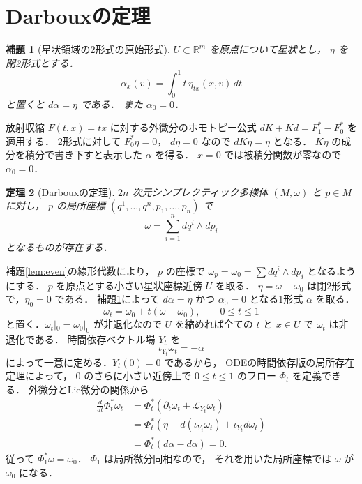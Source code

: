 \documentclass[a5paper,10pt,onecolumn]{jsarticle}
\makeatletter
\theoremstyle{mathnotetheorem}
\newtheorem{theorem}{定理}[section]
\newtheorem{lemma}[theorem]{補題}
\renewcommand{\proofname}{証明}
\renewenvironment{proof}[1][\proofname]{%
  \par\pushQED{\qed}\normalfont\topsep4\p@\@plus2\p@\relax
  \trivlist\item[\hskip\labelsep\bfseries #1]\ignorespaces
}{\popQED\endtrivlist\@endpefalse}
\makeatother
\begin{document}
\section{Darbouxの定理}
\begin{lemma}[星状領域の2形式の原始形式]\label{lem:poincare}
$U\subset\mathbb R^m$ を原点について星状とし，
$\eta$ を閉2形式とする．
\[
 \alpha_x(v)=\int_0^1t\,\eta_{tx}(x,v)\,dt
\]
と置くと $d\alpha=\eta$ である．
また $\alpha_0=0$．
\end{lemma}
\begin{proof}
放射収縮 $F(t,x)=tx$ に対する外微分のホモトピー公式
$dK+Kd=F_1^*-F_0^*$ を適用する．
2形式に対して $F_0^*\eta=0$，
$d\eta=0$ なので $dK\eta=\eta$ となる．
$K\eta$ の成分を積分で書き下すと表示した $\alpha$ を得る．
$x=0$ では被積分関数が零なので $\alpha_0=0$．
\end{proof}
\begin{theorem}[Darbouxの定理]\label{thm:darboux}
$2n$ 次元シンプレクティック多様体 $(M,\omega)$ と
$p\in M$ に対し，
$p$ の局所座標 $(q^1,\dots,q^n,p_1,\dots,p_n)$ で
\[
 \omega=\sum_{i=1}^n dq^i\wedge dp_i
\]
となるものが存在する．
\end{theorem}
\begin{proof}
補題\ref{lem:even}の線形代数により，
$p$ の座標で $\omega_p=\omega_0=\sum dq^i\wedge dp_i$
となるようにする．
$p$ を原点とする小さい星状座標近傍 $U$ を取る．
$\eta=\omega-\omega_0$ は閉2形式で，$\eta_0=0$ である．
補題\ref{lem:poincare}によって $d\alpha=\eta$ かつ
$\alpha_0=0$ となる1形式 $\alpha$ を取る．
\[
 \omega_t=\omega_0+t(\omega-\omega_0),\qquad 0\le t\le1
\]
と置く．$\omega_t|_0=\omega_0|_0$ が非退化なので
$U$ を縮めれば全ての $t$ と $x\in U$ で $\omega_t$ は非退化である．
時間依存ベクトル場 $Y_t$ を
\[
 \iota_{Y_t}\omega_t=-\alpha
\]
によって一意に定める．$Y_t(0)=0$ であるから，
ODEの時間依存版の局所存在定理によって，
$0$ のさらに小さい近傍上で $0\le t\le1$ のフロー
$\Phi_t$ を定義できる．
外微分とLie微分の関係から
\[
 \begin{aligned}
 \frac d{dt}\Phi_t^*\omega_t
 &=\Phi_t^*(\partial_t\omega_t+\mathcal L_{Y_t}\omega_t)\\
 &=\Phi_t^*(\eta+d(\iota_{Y_t}\omega_t)
 +\iota_{Y_t}d\omega_t)\\
 &=\Phi_t^*(d\alpha-d\alpha)=0.
 \end{aligned}
\]
従って $\Phi_1^*\omega=\omega_0$．
$\Phi_1$ は局所微分同相なので，
それを用いた局所座標では $\omega$ が $\omega_0$ になる．
\end{proof}
\end{document}
